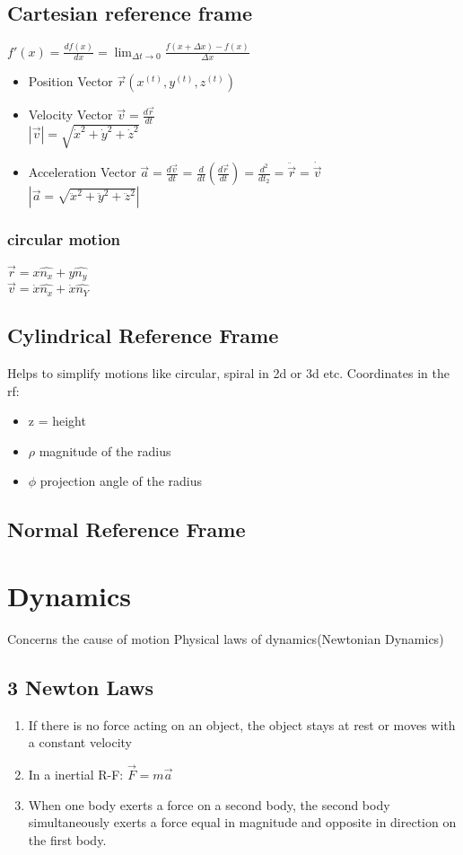 \documentclass{article}
\begin{document}
\subsection{Cartesian reference frame}
$f'(x) = \frac{df(x)}{dx} = \lim_{\Delta t\to 0} \frac{f(x + \Delta x)  - f(x)}{\Delta x}$
\begin{itemize}
	\item Position Vector $\vec{r}(x^{(t)}, y^{(t)}, z^{(t)})$
	\item Velocity Vector $\vec{v} = \frac{d\vec{r}}{dt}$ \\
	$|\vec{v}| = \sqrt{\dot{x}^2 + \dot{y}^2 + \dot{z}^2}$
	\item Acceleration Vector $\vec{a} = \frac{d\vec{v}}{dt}$ = $\frac{d}{dt}(\frac{d\vec{r}}{dt}) = \frac{d^2}{dt_2} = \ddot{\vec{r}} = \dot{\vec{v}}$ \\
	$|\vec{a} = \sqrt{\ddot{x}^2 + \ddot{y}^2 + \ddot{z}^2}|$
\end{itemize}
\subsubsection{circular motion}
$\vec{r} = x \hat{n_x} + y \hat{n_y}$ \\
$\vec{v} = \dot{x} \hat{n_x} + \dot{x} \hat{n_Y} $
\subsection{Cylindrical Reference Frame}
Helps to simplify motions like circular, spiral in 2d or 3d etc.
Coordinates in the rf:
\begin{itemize}
	\item z = height
	\item $\rho$ magnitude of the radius
	\item $\phi$ projection angle of the radius
\end{itemize}

\subsection{Normal Reference Frame}
\section{Dynamics}
Concerns the cause of motion
Physical laws of dynamics(Newtonian Dynamics) \\
\subsection{3 Newton Laws}
\begin{enumerate}
	\item If there is no force acting on an object, the object stays at rest or moves with a constant velocity
	\item In a inertial R-F:  $\vec{F} = m\vec{a}$
	\item When one body exerts a force on a second body, the second body simultaneously exerts a force equal in magnitude and opposite in direction on the first body.
\end{enumerate}
\end{document}
